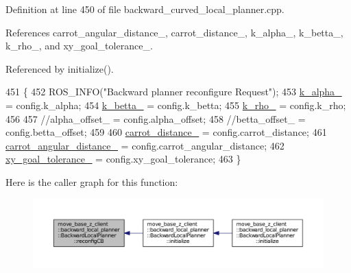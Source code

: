 Definition at line 450 of file backward\+\_\+curved\+\_\+local\+\_\+planner.\+cpp.



References carrot\+\_\+angular\+\_\+distance\+\_\+, carrot\+\_\+distance\+\_\+, k\+\_\+alpha\+\_\+, k\+\_\+betta\+\_\+, k\+\_\+rho\+\_\+, and xy\+\_\+goal\+\_\+tolerance\+\_\+.



Referenced by initialize().


\begin{DoxyCode}
451 \{
452     ROS\_INFO(\textcolor{stringliteral}{"Backward planner reconfigure Request"});
453     \hyperlink{classmove__base__z__client_1_1backward__local__planner_1_1BackwardLocalPlanner_ac859500c0329247de08daf864fd2d4b1}{k\_alpha\_} = config.k\_alpha;
454     \hyperlink{classmove__base__z__client_1_1backward__local__planner_1_1BackwardLocalPlanner_aa2f7fe022cdc4eb11c17f6f576c732c6}{k\_betta\_} = config.k\_betta;
455     \hyperlink{classmove__base__z__client_1_1backward__local__planner_1_1BackwardLocalPlanner_a9ae9a8c4c4663a999ba107aea9f6868d}{k\_rho\_} = config.k\_rho;
456 
457     \textcolor{comment}{//alpha\_offset\_ = config.alpha\_offset;}
458     \textcolor{comment}{//betta\_offset\_ = config.betta\_offset;}
459 
460     \hyperlink{classmove__base__z__client_1_1backward__local__planner_1_1BackwardLocalPlanner_a6dc3aa0ff63f9f7d0aae852755734b5d}{carrot\_distance\_} = config.carrot\_distance;
461     \hyperlink{classmove__base__z__client_1_1backward__local__planner_1_1BackwardLocalPlanner_a3d6cba0748b85a67f5dfd7740de9530f}{carrot\_angular\_distance\_} = config.carrot\_angular\_distance;
462     \hyperlink{classmove__base__z__client_1_1backward__local__planner_1_1BackwardLocalPlanner_a89ab1ee7283a474dc19970789f51c087}{xy\_goal\_tolerance\_} = config.xy\_goal\_tolerance;
463 \}
\end{DoxyCode}


Here is the caller graph for this function\+:
\nopagebreak
\begin{figure}[H]
\begin{center}
\leavevmode
\includegraphics[width=350pt]{classmove__base__z__client_1_1backward__local__planner_1_1BackwardLocalPlanner_a9dfe3fd3fd7a0c8ec414a78e1300d09c_icgraph}
\end{center}
\end{figure}


